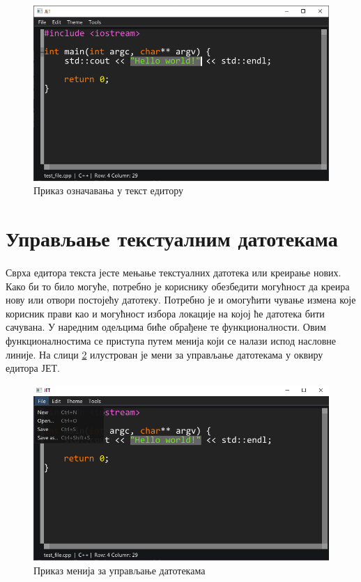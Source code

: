 \documentclass[12pt,oneside]{memoir}
\begin{document}
\begin{figure}[!ht]
	\centering
	\includegraphics[width=1.0\textwidth]{images/selection.png}
	\caption{Приказ означавања у текст едитору}
	\label{fig:selection}
\end{figure}

\section{Управљање текстуалним датотекама}
\paragraph{}
Сврха едитора текста јесте мењање текстуалних датотека или креирање нових. 
Како би то било могуће, потребно је кориснику обезбедити могућност да креира нову или 
отвори постојећу датотеку. Потребно је и омогућити чување измена које корисник
прави као и могућност избора локације на којој ће датотека бити сачувана. У наредним 
одељцима биће обрађене те функционалности. Овим функционалностима се приступа путем
менија који се налази испод насловне линије. На слици \ref{fig:file_menu} илустрован је мени за управљање датотекама у оквиру едитора ЈЕТ.

\begin{figure}[!ht]
	\centering
	\includegraphics[width=1.0\textwidth]{images/file_menu.png}
	\caption{Приказ менија за управљање датотекама}
	\label{fig:file_menu}
\end{figure}
\end{document}
